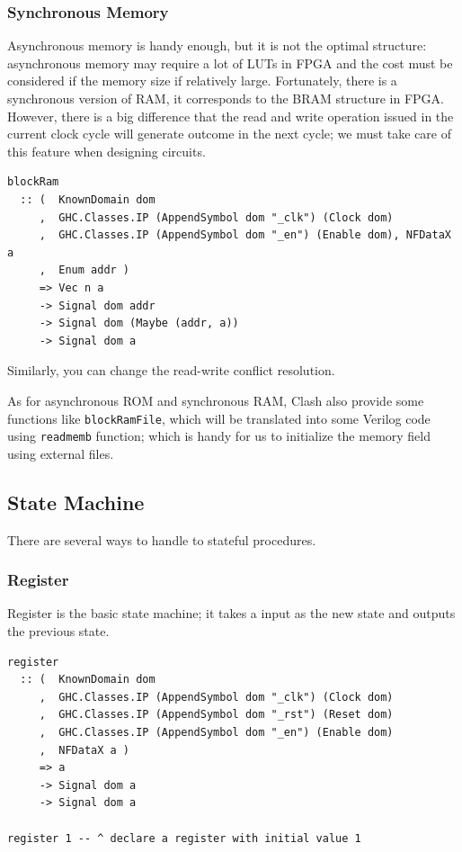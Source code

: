 \documentclass[a4paper,12pt, oneside]{book}
\begin{document}
\subsubsection{Synchronous Memory}
Asynchronous memory is handy enough, but it is not the optimal structure: asynchronous memory may require a lot of LUTs in FPGA and the cost must be considered if the memory size if relatively large. Fortunately, there is a synchronous version of RAM, it corresponds to the BRAM structure in FPGA. However, there is a big difference that the read and write operation issued in the current clock cycle will generate outcome in the next cycle; we must take care of this feature when designing circuits.
\begin{verbatim}
blockRam
  :: (  KnownDomain dom
     ,  GHC.Classes.IP (AppendSymbol dom "_clk") (Clock dom)
     ,  GHC.Classes.IP (AppendSymbol dom "_en") (Enable dom), NFDataX a
     ,  Enum addr ) 
     => Vec n a
     -> Signal dom addr 
     -> Signal dom (Maybe (addr, a)) 
     -> Signal dom a
\end{verbatim}

Similarly, you can change the read-write conflict resolution. 

As for asynchronous ROM and synchronous RAM, Clash also provide some functions like \texttt{blockRamFile}, which will be translated into some Verilog code using \texttt{readmemb} function; which is handy for us to initialize the memory field using external files.

\subsection{State Machine}
There are several ways to handle to stateful procedures.
\subsubsection{Register}
Register is the basic state machine; it takes a input as the new state and outputs the previous state.
\begin{verbatim}
register
  :: (  KnownDomain dom
     ,  GHC.Classes.IP (AppendSymbol dom "_clk") (Clock dom)
     ,  GHC.Classes.IP (AppendSymbol dom "_rst") (Reset dom)
     ,  GHC.Classes.IP (AppendSymbol dom "_en") (Enable dom)
     ,  NFDataX a ) 
     => a 
     -> Signal dom a 
     -> Signal dom a

register 1 -- ^ declare a register with initial value 1
\end{verbatim}
\end{document}
